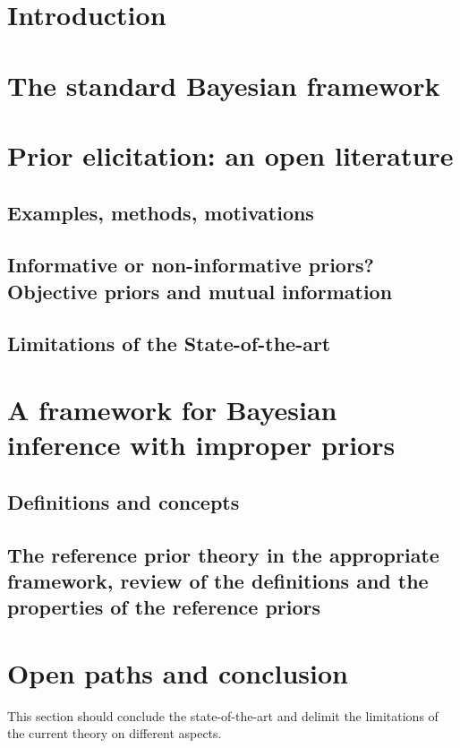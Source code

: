 


\section{Introduction}

\section{The standard Bayesian framework}

\section{Prior elicitation: an open literature}

\subsection{Examples, methods, motivations}

\subsection{Informative or non-informative priors? Objective priors and mutual information}


\subsection{Limitations of the State-of-the-art}

\section{A framework for Bayesian inference with improper priors}

\subsection{Definitions and concepts}


\subsection{The reference prior theory in the appropriate framework, review of the definitions and the properties of the reference priors}






\section{Open paths and conclusion}


This section should conclude the state-of-the-art and delimit the limitations of the current theory on different aspects. 













